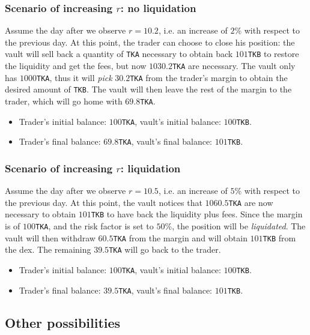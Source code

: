 \documentclass[a4paper,10 pt]{article}
\theoremstyle{definition}
\begin{document}
\subsubsection{Scenario of increasing $r$: no liquidation}
Assume the day after we observe $r = 10.2$, i.e. an increase of $2$\% with respect to the previous day.  At this point, the trader can choose to close his position: the vault will sell back a quantity of \verb|TKA| necessary to obtain back $101$\verb|TKB| to restore the liquidity and get the fees, but now $1030.2$\verb|TKA| are necessary. The vault only has $1000$\verb|TKA|, thus it will \emph{pick} $30.2$\verb|TKA| from the trader's margin to obtain the desired amount of \verb|TKB|. The vault will then leave the rest of the margin to the trader, which will go home with $69.8$\verb|TKA|.
\begin{itemize}
    \item Trader's initial balance: $100$\verb|TKA|, vault's initial balance: $100$\verb|TKB|.
    \item Trader's final balance: $69.8$\verb|TKA|, vault's final balance: $101$\verb|TKB|.
\end{itemize}

\subsubsection{Scenario of increasing $r$: liquidation}
Assume the day after we observe $r = 10.5$, i.e. an increase of $5$\% with respect to the previous day.  At this point, the vault notices that $1060.5$\verb|TKA| are now necessary to obtain $101$\verb|TKB| to have back the liquidity plus fees. Since the margin is of $100$\verb|TKA|, and the risk factor is set to $50$\%, the position will be \emph{liquidated}. The vault will then withdraw $60.5$\verb|TKA| from the margin and will obtain $101$\verb|TKB| from the dex. The remaining $39.5$\verb|TKA| will go back to the trader.
\begin{itemize}
    \item Trader's initial balance: $100$\verb|TKA|, vault's initial balance: $100$\verb|TKB|.
    \item Trader's final balance: $39.5$\verb|TKA|, vault's final balance: $101$\verb|TKB|.
\end{itemize}

\subsection{Other possibilities}
\end{document}
